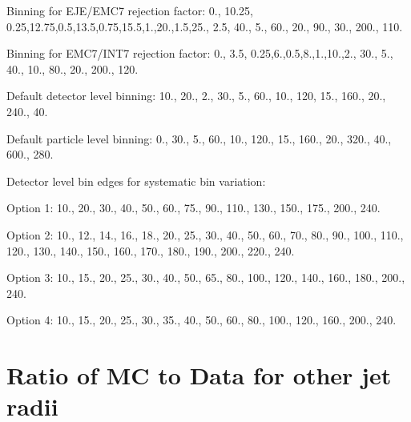 \documentclass[ALICE]{ALICE_analysis_notes}
\begin{document}
\begin{appendix}
Binning for EJE/EMC7 rejection factor:
0., {{10.25, 0.25},{12.75,0.5},{13.5,0.75},{15.5,1.},{20.,1.5},{25., 2.5}, {40., 5.}, {60., 20.}, {90., 30.}, {200., 110.}}

\bigskip

Binning for EMC7/INT7 rejection factor:
0., {{3.5, 0.25},{6.,0.5},{8.,1.},{10.,2.}, {30., 5.}, {40., 10.}, {80., 20.}, {200., 120.}}

\bigskip

Default detector level binning:
10., {{20., 2.}, {30., 5.}, {60., 10.}, {120, 15.}, {160., 20.}, {240., 40.}}

\bigskip

Default particle level binning:
0., {{30., 5.}, {60., 10.}, {120., 15.}, {160., 20.}, {320., 40.}, {600., 280.}}

\bigskip

Detector level bin edges for systematic bin variation:

\bigskip

Option 1:
10., 20., 30., 40., 50., 60., 75., 90., 110., 130., 150., 175., 200., 240.

\bigskip

Option 2:
10., 12., 14., 16., 18., 20., 25., 30., 40., 50., 60., 70., 80., 90., 100., 110., 120., 130., 140., 150., 160., 170., 180., 190., 200., 220., 240.

\bigskip

Option 3:
10., 15., 20., 25., 30., 40., 50., 65., 80., 100., 120., 140., 160., 180., 200., 240.

\bigskip

Option 4:
10., 15., 20., 25., 30., 35., 40., 50., 60., 80., 100., 120., 160., 200., 240.

\newpage

\section{Ratio of MC to Data for other jet radii}
\label{sec:appendixRatioSimData}


\end{appendix}
\end{document}
